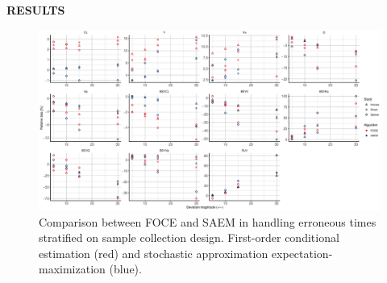 \documentclass[final]{beamer}
\begin{document}
\begin{frame}[t]
\begin{columns}[t]
\begin{column}{0.6\paperwidth}
\begin{block}{\textbf{RESULTS}}
\begin{figure}
\centering
\includegraphics[width=55cm]{Figure4.eps}
\caption{Comparison between FOCE and SAEM in handling erroneous times stratified on sample collection design. First-order conditional estimation (red) and stochastic approximation expectation-maximization (blue).}
\end{figure} 
\end{block}

\end{column}

\end{columns}
\end{frame}
\end{document}
